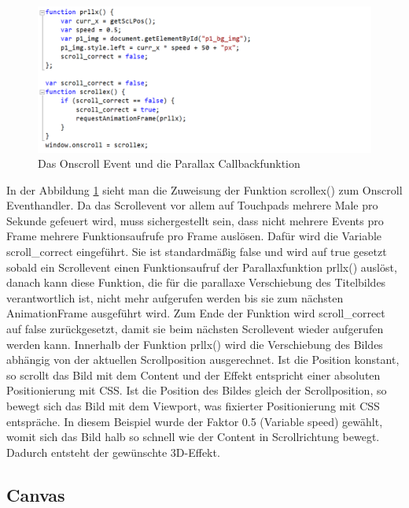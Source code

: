 \begin{figure} [h]
\includegraphics[width=\textwidth]{./img/js_scrollex.png}
\caption{Das Onscroll Event und die Parallax Callbackfunktion}
\label{js_scrollex}
\end{figure}
In der Abbildung \ref{js_scrollex} sieht man die Zuweisung der Funktion scrollex() zum Onscroll Eventhandler. Da das Scrollevent vor allem auf Touchpads mehrere Male pro Sekunde gefeuert wird, muss sichergestellt sein, dass nicht mehrere Events pro Frame mehrere Funktionsaufrufe pro Frame auslösen. Dafür wird die Variable scroll\_correct eingeführt. Sie ist standardmäßig false und wird auf true gesetzt sobald ein Scrollevent einen Funktionsaufruf der Parallaxfunktion prllx() auslöst, danach kann diese Funktion, die für die parallaxe Verschiebung des Titelbildes verantwortlich ist, nicht mehr aufgerufen werden bis sie zum nächsten AnimationFrame ausgeführt wird. Zum Ende der Funktion wird scroll\_correct auf false zurückgesetzt, damit sie beim nächsten Scrollevent wieder aufgerufen werden kann. Innerhalb der Funktion prllx() wird die Verschiebung des Bildes abhängig von der aktuellen Scrollposition ausgerechnet. Ist die Position konstant, so scrollt das Bild mit dem Content und der Effekt entspricht einer absoluten Positionierung mit CSS. Ist die Position des Bildes gleich der Scrollposition, so bewegt sich das Bild mit dem Viewport, was fixierter Positionierung mit CSS entspräche. In diesem Beispiel wurde der Faktor 0.5 (Variable speed) gewählt, womit sich das Bild halb so schnell wie der Content in Scrollrichtung bewegt. Dadurch entsteht der gewünschte 3D-Effekt.




\subsection{Canvas}

